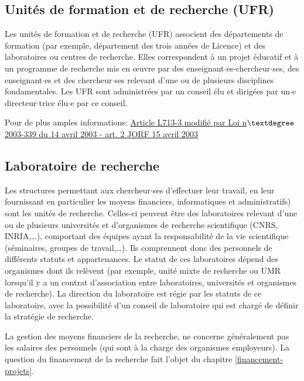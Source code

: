 \subsection{Unit\'es de formation et de recherche (UFR)}
Les unit\'es de formation et de recherche (UFR) associent des d\'epartements de formation (par exemple, d\'epartement des trois ann\'ees de Licence) et des laboratoires ou centres de recherche. Elles correspondent \`a un projet \'educatif et \`a un programme de recherche mis en \oe uvre par des enseignant$\cdot$es-chercheur$\cdot$ses, des enseignant$\cdot$es et des chercheur$\cdot$ses relevant d'une ou de plusieurs disciplines fondamentales. Les UFR sont administr\'ees par un conseil \'elu et dirig\'ees par un$\cdot$e directeur$\cdot$trice \'elu$\cdot$e par ce conseil.

Pour de plus amples informations: 
\href{https://www.legifrance.gouv.fr/affichCode.do;jsessionid=6C65A5741617DEF72E5BAC5710E2EE64.tpdila20v_1?idSectionTA=LEGISCTA000006182444&cidTexte=LEGITEXT000006071191&dateTexte=20170114}{Article L713-3 modifi\'e par Loi n$\textdegree$2003-339 du 14 avril 2003 - art. 2 JORF 15 avril 2003}

\subsection{Laboratoire de recherche}
Les structures permettant aux chercheur$\cdot$ses d'effectuer leur travail, en leur fournissant en particulier les moyens financiers, informatiques et administratifs) sont les unit\'es de recherche. Celles-ci peuvent \^etre des laboratoires relevant d'une ou de plusieurs universit\'es et d'organismes de recherche scientifique (CNRS, INRIA,\ldots), comportant des \'equipes ayant la responsabilit\'e de la vie scientifique (s\'eminaires, groupes de travail,\ldots). Ils comprennent donc des personnels de diff\'erents statuts et appartenances. Le statut de ces laboratoires d\'epend des organismes dont ils rel\`event (par exemple, unit\'e mixte de recherche ou UMR lorsqu'il y a un contrat d'association entre laboratoires, universit\'es et organismes de recherche). La direction du laboratoire est r\'egie par les statuts de ce laboratoire, avec la possibilit\'e d'un conseil de laboratoire qui est charg\'e de d\'efinir la strat\'egie de recherche.

La gestion des moyens financiers de la recherche, ne concerne g\'en\'eralement pas les salaires des personnels (qui sont \`a la charge des organismes employeurs). La question du financement de la recherche fait l'objet du chapitre \ref{financement-projets}. \\

